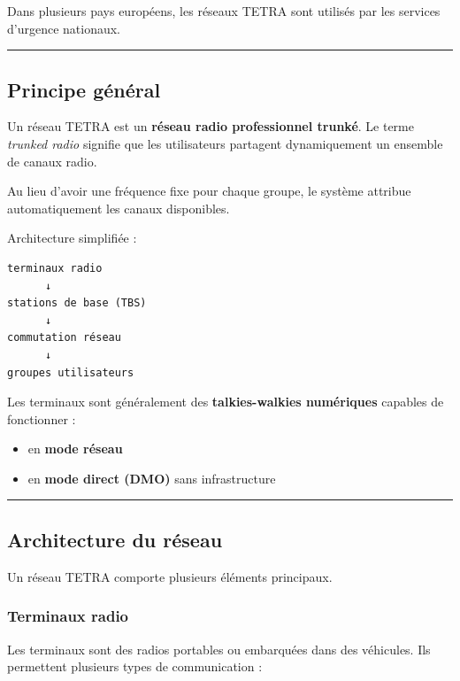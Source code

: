 \documentclass[
  french,
]{article}
\providecommand{\tightlist}{%
  \setlength{\itemsep}{0pt}\setlength{\parskip}{0pt}}
\begin{document}
Dans plusieurs pays européens, les réseaux TETRA sont utilisés par les
services d'urgence nationaux.

\begin{center}\rule{0.5\linewidth}{0.5pt}\end{center}

\subsection{Principe général}\label{principe-guxe9nuxe9ral}

Un réseau TETRA est un \textbf{réseau radio professionnel trunké}. Le
terme \emph{trunked radio} signifie que les utilisateurs partagent
dynamiquement un ensemble de canaux radio.

Au lieu d'avoir une fréquence fixe pour chaque groupe, le système
attribue automatiquement les canaux disponibles.

Architecture simplifiée :

\begin{verbatim}
terminaux radio
      ↓
stations de base (TBS)
      ↓
commutation réseau
      ↓
groupes utilisateurs
\end{verbatim}

Les terminaux sont généralement des \textbf{talkies-walkies numériques}
capables de fonctionner :

\begin{itemize}
\tightlist
\item
  en \textbf{mode réseau}
\item
  en \textbf{mode direct (DMO)} sans infrastructure
\end{itemize}

\begin{center}\rule{0.5\linewidth}{0.5pt}\end{center}

\subsection{Architecture du réseau}\label{architecture-du-ruxe9seau}

Un réseau TETRA comporte plusieurs éléments principaux.

\subsubsection{Terminaux radio}\label{terminaux-radio}

Les terminaux sont des radios portables ou embarquées dans des
véhicules. Ils permettent plusieurs types de communication :
\end{document}
